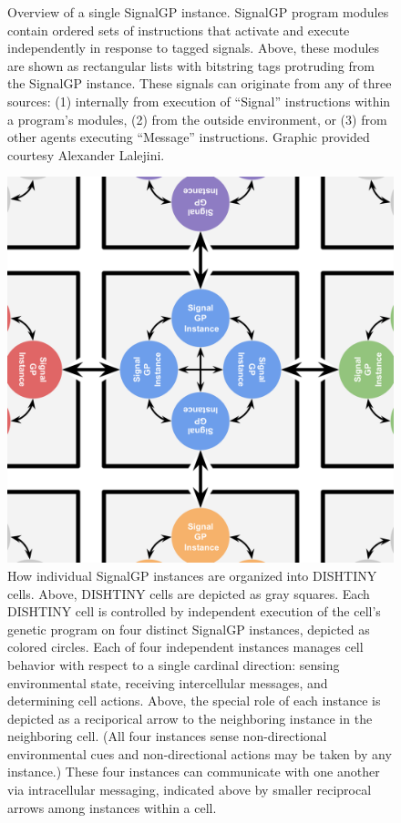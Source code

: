 \begin{figure}
\begin{center}
\begin{minipage}{0.49\textwidth}
Overview of a single SignalGP instance.
SignalGP program modules contain ordered sets of instructions that activate and execute independently in response to tagged signals.
Above, these modules are shown as rectangular lists with bitstring tags protruding from the SignalGP instance.
These signals can originate from any of three sources:
  (1) internally from execution of ``Signal'' instructions within a program's modules,
  (2) from the outside environment, or
  (3) from other agents executing ``Message'' instructions.
Graphic provided courtesy Alexander Lalejini.
\end{minipage}
\begin{minipage}{0.49\textwidth}
  \includegraphics[width=\linewidth]{img/dishtinygp-cartoon}
  How individual SignalGP instances are organized into DISHTINY cells.
  Above, DISHTINY cells are depicted as gray squares.
  Each DISHTINY cell is controlled by independent execution of the cell's genetic program on four distinct SignalGP instances, depicted as colored circles.
  Each of four independent instances manages cell behavior with respect to a single cardinal direction: sensing environmental state, receiving intercellular messages, and determining cell actions.
  Above, the special role of each instance is depicted as a reciporical arrow to the neighboring instance in the neighboring cell.
  (All four instances sense non-directional environmental cues and non-directional actions may be taken by any instance.)
  These four instances can communicate with one another via intracellular messaging, indicated above by smaller reciprocal arrows among instances within a cell.
\end{minipage}


\end{center}
\end{figure}
